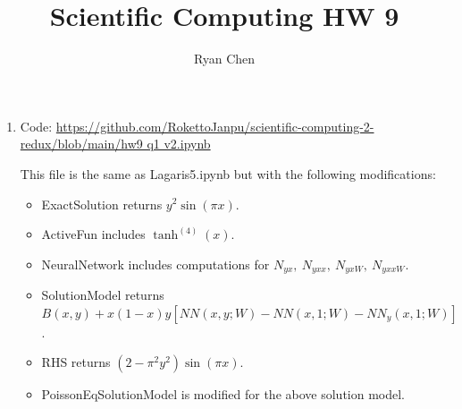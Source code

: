 \documentclass{article}
\title{Scientific Computing HW 9}
\author{Ryan Chen}
\begin{document}
	
\maketitle



\begin{enumerate}
	
	
	
\item Code: \url{https://github.com/RokettoJanpu/scientific-computing-2-redux/blob/main/hw9 q1 v2.ipynb}

This file is the same as Lagaris5.ipynb but with the following modifications:

\begin{itemize}
	\item ExactSolution returns $y^2\sin(\pi x)$.
	\item ActiveFun includes $\tanh^{(4)}(x)$.
	\item NeuralNetwork includes computations for $N_{yx},~N_{yxx},~N_{yxW},~N_{yxxW}$.
	\item SolutionModel returns $B(x,y) + x(1-x)y[NN(x,y;W)-NN(x,1;W)-NN_y(x,1;W)]$.
	\item RHS returns $(2-\pi^2y^2)\sin(\pi x)$.
	\item PoissonEqSolutionModel is modified for the above solution model.
\end{itemize}


\end{enumerate}
\end{document}
